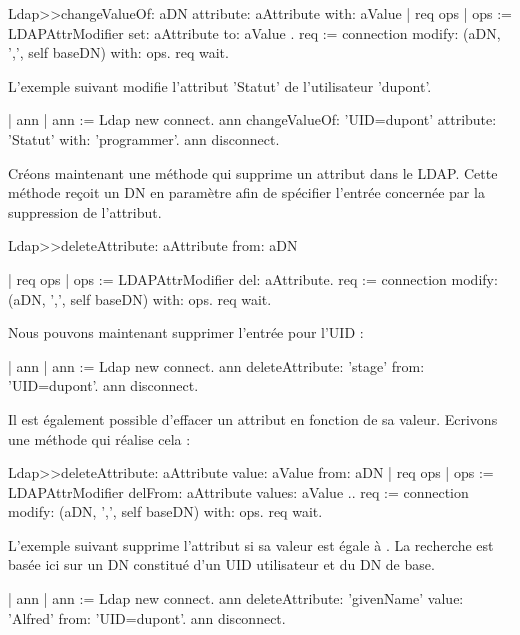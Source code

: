 \documentclass[a4paper,10pt,twoside]{book}
\begin{document}
\begin{code}{}
Ldap>>changeValueOf: aDN attribute: aAttribute with: aValue 
	| req ops |
	ops := { LDAPAttrModifier set: aAttribute to: { aValue }}. 
	req := connection modify: (aDN, ',', self baseDN) with: ops. 
	req wait.
\end{code}


L'exemple suivant modifie l'attribut 'Statut' de l'utilisateur 'dupont'.
\begin{code}{}
	| ann |
	ann := Ldap new connect. 
	ann changeValueOf: 'UID=dupont' attribute: 'Statut' with: 'programmer'. 
	ann disconnect.
\end{code}

Cr\'eons maintenant une m\'ethode qui supprime un attribut dans le LDAP. Cette m\'ethode re\c coit un DN en param\`etre afin de sp\'ecifier l'entr\'ee concern\'ee par la suppression de l'attribut.

\begin{code}{}
Ldap>>deleteAttribute: aAttribute from: aDN 
	
	| req ops |
	ops := { LDAPAttrModifier del: aAttribute}. 
	req := connection modify: (aDN, ',', self baseDN) with: ops. 
	req wait.
\end{code}

Nous pouvons maintenant supprimer l'entr\'ee  pour l'UID  :

\begin{code}{}
	| ann |
	ann := Ldap new connect. 
	ann deleteAttribute: 'stage' from: 'UID=dupont'. 
	ann disconnect.
\end{code}
Il est \'egalement possible d'effacer un attribut en fonction de sa valeur. Ecrivons une m\'ethode  qui r\'ealise cela :

\begin{code}{}
Ldap>>deleteAttribute: aAttribute value: aValue from: aDN | req ops |
	ops := { LDAPAttrModifier delFrom: aAttribute values: { aValue }.}.
	req := connection modify: (aDN, ',', self baseDN) with: ops. 
	req wait.
\end{code}

L'exemple suivant supprime l'attribut  si sa valeur est \'egale \`a . La recherche est bas\'ee ici sur un DN constitu\'e d'un UID utilisateur et du DN de base.

\begin{code}{}
	| ann |
	ann := Ldap new connect. 
	ann deleteAttribute: 'givenName' value: 'Alfred' from: 'UID=dupont'. 
	ann disconnect.
\end{code}
\end{document}
